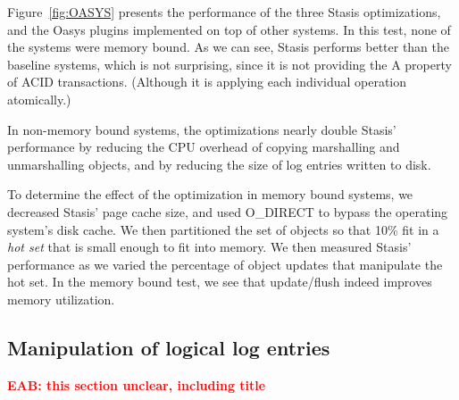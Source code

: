 \documentclass[letterpaper,twocolumn,10pt]{article}
\newcommand{\yad}{Stasis\xspace}
\newcommand{\yads}{Stasis'\xspace}
\newcommand{\oasys}{Oasys\xspace}
\newcommand{\eab}[1]{\textcolor{red}{\bf EAB: #1}}
\begin{document}
Figure~\ref{fig:OASYS} presents the performance of the three \yad
optimizations, and the \oasys plugins implemented on top of other
systems.  In this test, none of the systems were memory bound.  As
we can see, \yad performs better than the baseline systems, which is
not surprising, since it is not providing the A property of ACID
transactions.  (Although it is applying each individual operation
atomically.)

In non-memory bound systems, the optimizations nearly double \yads
performance by reducing the CPU overhead of copying marshalling and
unmarshalling objects, and by reducing the size of log entries written
to disk.

To determine the effect of the optimization in memory bound systems,
we decreased \yads page cache size, and used O\_DIRECT to bypass the
operating system's disk cache.  We then partitioned the set of objects
so that 10\% fit in a {\em hot set} that is small enough to fit into
memory.  We then measured \yads performance as we varied the
percentage of object updates that manipulate the hot set.  In the
memory bound test, we see that update/flush indeed improves memory
utilization.

\subsection{Manipulation of logical log entries}

\eab{this section unclear, including title}
\end{document}
